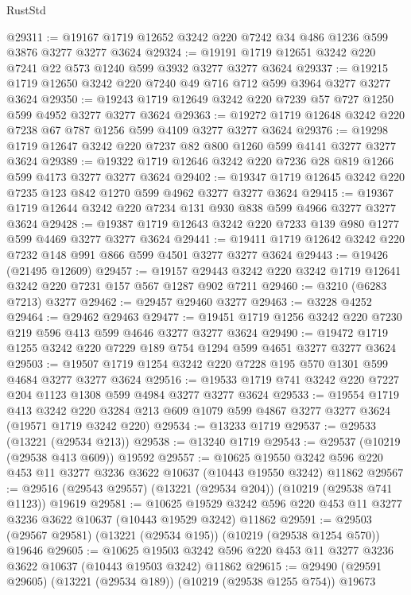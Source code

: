 \begin{lexlean}{RustStd}
\begin{coremodule}
@29311 := @19167 @1719 @12652 @3242 @220 @7242 @34 @486 @1236 @599 @3876 @3277 @3277 @3624
@29324 := @19191 @1719 @12651 @3242 @220 @7241 @22 @573 @1240 @599 @3932 @3277 @3277 @3624
@29337 := @19215 @1719 @12650 @3242 @220 @7240 @49 @716 @712 @599 @3964 @3277 @3277 @3624
@29350 := @19243 @1719 @12649 @3242 @220 @7239 @57 @727 @1250 @599 @4952 @3277 @3277 @3624
@29363 := @19272 @1719 @12648 @3242 @220 @7238 @67 @787 @1256 @599 @4109 @3277 @3277 @3624
@29376 := @19298 @1719 @12647 @3242 @220 @7237 @82 @800 @1260 @599 @4141 @3277 @3277 @3624
@29389 := @19322 @1719 @12646 @3242 @220 @7236 @28 @819 @1266 @599 @4173 @3277 @3277 @3624
@29402 := @19347 @1719 @12645 @3242 @220 @7235 @123 @842 @1270 @599 @4962 @3277 @3277 @3624
@29415 := @19367 @1719 @12644 @3242 @220 @7234 @131 @930 @838 @599 @4966 @3277 @3277 @3624
@29428 := @19387 @1719 @12643 @3242 @220 @7233 @139 @980 @1277 @599 @4469 @3277 @3277 @3624
@29441 := @19411 @1719 @12642 @3242 @220 @7232 @148 @991 @866 @599 @4501 @3277 @3277 @3624
@29443 := @19426 (@21495 @12609)
@29457 := @19157 @29443 @3242 @220 @3242 @1719 @12641 @3242 @220 @7231 @157 @567 @1287 @902 @7211
@29460 := @3210 (@6283 @7213) @3277
@29462 := @29457 @29460 @3277
@29463 := @3228 @4252
@29464 := @29462 @29463
@29477 := @19451 @1719 @1256 @3242 @220 @7230 @219 @596 @413 @599 @4646 @3277 @3277 @3624
@29490 := @19472 @1719 @1255 @3242 @220 @7229 @189 @754 @1294 @599 @4651 @3277 @3277 @3624
@29503 := @19507 @1719 @1254 @3242 @220 @7228 @195 @570 @1301 @599 @4684 @3277 @3277 @3624
@29516 := @19533 @1719 @741 @3242 @220 @7227 @204 @1123 @1308 @599 @4984 @3277 @3277 @3624
@29533 := @19554
    @1719
    @413
    @3242
    @220
    @3284
    @213
    @609
    @1079
    @599
    @4867
    @3277
    @3277
    @3624
    (@19571 @1719 @3242 @220)
@29534 := @13233 @1719
@29537 := @29533 (@13221 (@29534 @213))
@29538 := @13240 @1719
@29543 := @29537 (@10219 (@29538 @413 @609)) @19592
@29557 := @10625
    @19550
    @3242
    @596
    @220
    @453
    @11
    @3277
    @3236
    @3622
    @10637
    (@10443 @19550 @3242)
    @11862
@29567 := @29516 (@29543 @29557) (@13221 (@29534 @204)) (@10219 (@29538 @741 @1123)) @19619
@29581 := @10625
    @19529
    @3242
    @596
    @220
    @453
    @11
    @3277
    @3236
    @3622
    @10637
    (@10443 @19529 @3242)
    @11862
@29591 := @29503 (@29567 @29581) (@13221 (@29534 @195)) (@10219 (@29538 @1254 @570)) @19646
@29605 := @10625
    @19503
    @3242
    @596
    @220
    @453
    @11
    @3277
    @3236
    @3622
    @10637
    (@10443 @19503 @3242)
    @11862
@29615 := @29490 (@29591 @29605) (@13221 (@29534 @189)) (@10219 (@29538 @1255 @754)) @19673

\end{coremodule}
\end{lexlean}
